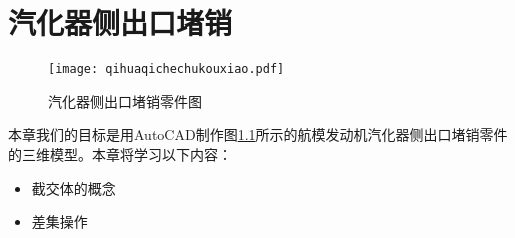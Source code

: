 \chapter{汽化器侧出口堵销}
\begin{figure}[htbp]
\centering
\texttt{[image: qihuaqichechukouxiao.pdf]}
\caption{汽化器侧出口堵销零件图}\label{fig:qihuaqichechukouxiao}
\end{figure}
本章我们的目标是用AutoCAD制作图\ref{fig:qihuaqichechukouxiao}所示的航模发动机汽化器侧出口堵销零件的三维模型。本章将学习以下内容：
\begin{itemize}
	\item 截交体的概念
	\item 差集操作
\end{itemize}
